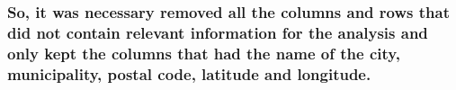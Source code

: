 \documentclass[11pt]{article}
\begin{document}
\hypertarget{so-it-was-necessary-removed-all-the-columns-and-rows-that-did-not-contain-relevant-information-for-the-analysis-and-only-kept-the-columns-that-had-the-name-of-the-city-municipality-postal-code-latitude-and-longitude.}{%
\subsubsection{So, it was necessary removed all the columns and rows
that did not contain relevant information for the analysis and only kept
the columns that had the name of the city, municipality, postal code,
latitude and
longitude.}\label{so-it-was-necessary-removed-all-the-columns-and-rows-that-did-not-contain-relevant-information-for-the-analysis-and-only-kept-the-columns-that-had-the-name-of-the-city-municipality-postal-code-latitude-and-longitude.}}
\end{document}
